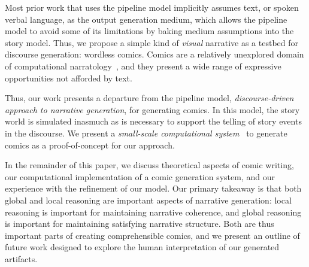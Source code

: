 Most prior work that uses the pipeline model implicitly assumes text, or
spoken verbal language, as the output generation medium, which allows the
pipeline model to avoid some of its limitations by baking medium
assumptions into the story model. %
Thus, we propose a simple kind of {\em visual} narrative as a testbed for
discourse generation: wordless comics. Comics are a relatively unexplored
domain of computational narratology~\cite{mani2012computational}, and they
present a wide range of expressive opportunities not afforded by text.

Thus, our work presents a departure from the pipeline model, 
\emph{discourse-driven approach to narrative generation}, for generating
comics. In this model, the story world is simulated inasmuch as is
necessary to support the telling of story events in the discourse. We
present a \emph{small-scale computational system}~\cite{montfort2012small}
to generate comics as a proof-of-concept for our approach.

In the remainder of this paper, we discuss theoretical aspects of comic
writing, our computational implementation of a comic generation system, and
our experience with the refinement of our model. Our primary takeaway is
that both global and local reasoning are important aspects of
narrative generation: local reasoning is important for maintaining
narrative coherence, and global reasoning is important for
maintaining satisfying narrative structure. Both are thus important parts
of creating comprehensible comics, and we present an outline of future work
designed to explore the human interpretation of our generated artifacts.



